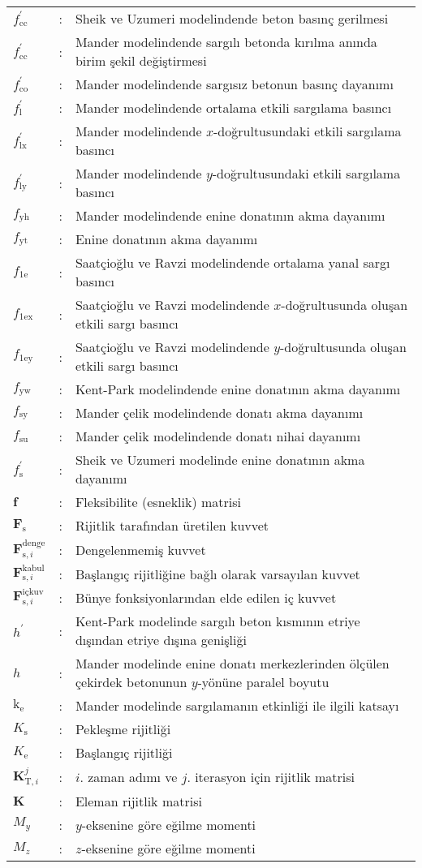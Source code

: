 \begin{longtable}{>{\raggedright}p{1cm}l>{\raggedright}p{13.4cm}}
$f_{\text{cc}}^{'}$ & : & Sheik ve Uzumeri modelindende beton basınç gerilmesi\tabularnewline
$f_{\text{cc}}^{'}$ & : & Mander modelindende sargılı betonda kırılma anında birim şekil değiştirmesi\tabularnewline
$f_{\text{co}}^{'}$ & : & Mander modelindende sargısız betonun basınç dayanımı \tabularnewline
$f_{\text{l}}^{'}$ & : & Mander modelindende ortalama etkili sargılama basıncı\tabularnewline
$f_{\text{lx}}^{'}$ & : & Mander modelindende $x$-doğrultusundaki etkili sargılama basıncı\tabularnewline
$f_{\text{ly}}^{'}$ & : & Mander modelindende $y$-doğrultusundaki etkili sargılama basıncı\tabularnewline
$f_{\text{yh}}$ & : & Mander modelindende enine donatının akma dayanımı\tabularnewline
$f_{\text{yt}}$ & : & Enine donatının akma dayanımı\tabularnewline
$f_{\text{1e}}$ & : & Saatçioğlu ve Ravzi modelindende ortalama yanal sargı basıncı\tabularnewline
$f_{\text{1ex}}$ & : & Saatçioğlu ve Ravzi modelindende $x$-doğrultusunda oluşan etkili
sargı basıncı\tabularnewline
$f_{\text{1ey}}$ & : & Saatçioğlu ve Ravzi modelindende $y$-doğrultusunda oluşan etkili
sargı basıncı\tabularnewline
$f_{\text{yw}}$ & : & Kent-Park modelindende enine donatının akma dayanımı\tabularnewline
$f_{\text{sy}}$ & : & Mander çelik modelindende donatı akma dayanımı\tabularnewline
$f_{\text{su}}$ & : & Mander çelik modelindende donatı nihai dayanımı\tabularnewline
$f_{\text{s}}^{'}$ & : & Sheik ve Uzumeri modelinde enine donatının akma dayanımı\tabularnewline
$\mathbf{f}$ & : & Fleksibilite (esneklik) matrisi\tabularnewline
$\mathbf{F}_{\text{s}}$ & : & Rijitlik tarafından üretilen kuvvet\tabularnewline
$\mathbf{F}_{\text{s},i}^{\text{denge}}$ & : & Dengelenmemiş kuvvet\tabularnewline
$\mathbf{F}_{\text{s},i}^{\text{kabul}}$ & : & Başlangıç rijitliğine bağlı olarak varsayılan kuvvet\tabularnewline
$\mathbf{F}_{\text{s},i}^{\text{içkuv}}$ & : & Bünye fonksiyonlarından elde edilen iç kuvvet\tabularnewline
$h^{'}$ & : & Kent-Park modelinde sargılı beton kısmının etriye dışından etriye
dışına genişliği\tabularnewline
$h$ & : & Mander modelinde enine donatı merkezlerinden ölçülen çekirdek betonunun
$y$-yönüne paralel boyutu\tabularnewline
$\text{k}_{\text{e}}$ & : & Mander modelinde sargılamanın etkinliği ile ilgili katsayı\tabularnewline
$K_{\text{s}}$ & : & Pekleşme rijitliği \tabularnewline
$K_{\text{e}}$ & : & Başlangıç rijitliği\tabularnewline
$\mathbf{K}_{\text{T},i}^{j}$ & : & $i.$ zaman adımı ve $j.$ iterasyon için rijitlik matrisi \tabularnewline
$\mathbf{K}$ & : & Eleman rijitlik matrisi\tabularnewline
$M_{y}$ & : & $y$-eksenine göre eğilme momenti\tabularnewline
$M_{z}$ & : & $z$-eksenine göre eğilme momenti\tabularnewline

\end{longtable}
